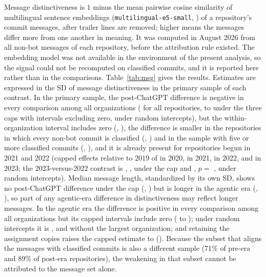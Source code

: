 \documentclass[acmsmall,screen,review,anonymous]{acmart}
\begin{document}
Message distinctiveness is $1$ minus the mean pairwise cosine similarity of multilingual sentence embeddings (\texttt{multilingual-e5-small}, \citealp{wang2024multilingual}) of a repository's commit messages, after trailer lines are removed; higher means the messages differ more from one another in meaning. It was computed in August 2026 from all non-bot messages of each repository, before the attribution rule existed. The embedding model was not available in the environment of the present analysis, so the signal could not be recomputed on classified commits, and it is reported here rather than in the comparisons. Table~\ref{tab:msg} gives the results. Estimates are expressed in the SD of message distinctiveness in the primary sample of each contrast. In the primary sample, the post-ChatGPT difference is negative in every comparison among all organizations ( for all repositories,  to  under the three caps with intervals excluding zero,  under random intercepts), but the within-organization interval includes zero (, ), the difference is smaller in the repositories in which every non-bot commit is classified (, ) and in the sample with five or more classified commits (, ), and it is already present for repositories begun in 2021 and 2022 (capped effects relative to 2019 of  in 2020,  in 2021,  in 2022, and  in 2023; the 2023-versus-2022 contrast is , , under the cap and , $p = $ , under random intercepts). Median message length, standardized by its own SD, shows no post-ChatGPT difference under the cap (, ) but is longer in the agentic era (, ), so part of any agentic-era difference in distinctiveness may reflect longer messages. In the agentic era the difference is positive in every comparison among all organizations but its capped intervals include zero ( to ); under random intercepts it is , and  without the largest organization; and retaining the assignment copies raises the capped estimate to  (). Because the subset that aligns the messages with classified commits is also a different sample (71\% of pre-era and 89\% of post-era repositories), the weakening in that subset cannot be attributed to the message set alone.
\end{document}

